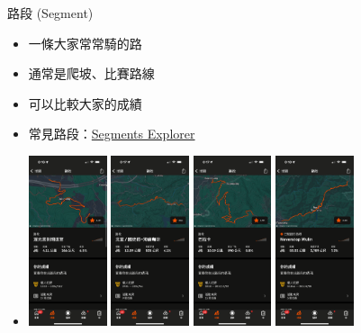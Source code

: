 \begin{frame}{路段 (Segment)}
\begin{itemize}
\item 一條大家常常騎的路
\item 通常是爬坡、比賽路線
\item 可以比較大家的成績
\item 常見路段：\href{https://brianhsu7476.github.io/segmentsExplorer/}{Segments Explorer}
\item \includegraphics[height=5cm]{maokongSegment.png}
\includegraphics[height=5cm]{coffeeSegment.png}
\includegraphics[height=5cm]{balakaSegment.png}
\includegraphics[height=5cm]{wulingSegment.png}
\end{itemize}
\end{frame}

